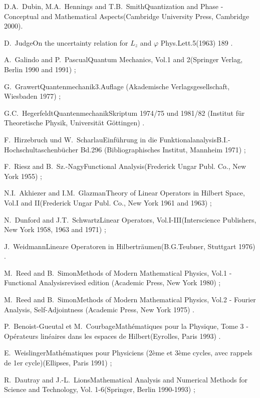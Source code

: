 \documentclass[a4wide,12pt]{report}
\begin{document}
\begin{thebibliography}{22}
\bookref
{D.A.~Dubin, M.A.~Hennings and T.B.~Smith}{Quantization and Phase -
Conceptual and Mathematical Aspects}{(Cambridge University Press,
Cambridge 2000).}

\artref
{D.~Judge}{On the uncertainty relation for $L_z$ and $\varphi$}{
Phys.Lett.}{5}{(1963) 189 .}

 
\bookref
{A.~Galindo and P.~Pascual}{Quantum Mechanics, Vol.1 and 2}{(Springer
Verlag, Berlin 1990 and 1991) ;}
 
\bookref
{G.~Grawert}{Quantenmechanik}{3.Auflage
(Akademische Verlagsgesellschaft,
Wiesbaden 1977) ;}
 
\bookref
{G.C.~Hegerfeldt}{Quantenmechanik}{Skriptum
1974/75 und 1981/82 (Institut f\"ur Theoretische Physik,
Universit\"at G\"ottingen) .}
 
 
\bookref
{F.~Hirzebruch und W.~Scharlau}{Einf\"uhrung in die
Funktional\-analysis}{B.I.-Hochschultaschenb\"ucher
Bd.296 (Bibliographisches Institut,
Mannheim 1971) ;}
 
\bookref
{F.~Riesz and B.~Sz.-Nagy}{Functional Analysis}{(Frederick Ungar
Publ. Co., New York 1955) ;}
 
\bookref
{N.I.~Akhiezer and I.M.~Glazman}{Theory of Linear Operators in
Hilbert Space, Vol.I and II}{(Frederick Ungar Publ. Co., New York 1961
and 1963) ;}
 
\bookref
{N.~Dunford and J.T.~Schwartz}{Linear Operators,
Vol.I-III}{(Interscience Publishers, New York 1958, 1963 and 1971) ;}
 
\bookref
{J.~Weidmann}{Lineare Operatoren in Hilbertr\"aumen}{(B.G.Teubner,
Stuttgart 1976) .}
 

\bookref
{M.~Reed and B.~Simon}{Methods of Modern Mathematical Physics, Vol.1 -
Functional Analysis}{revised edition
(Academic Press, New York 1980) ;}
 
\bookref
{M.~Reed and B.~Simon}{Methods of Modern Mathematical Physics, Vol.2 -
Fourier Analysis, Self-Adjointness}{
(Academic Press, New York 1975) .}
 

\bookref
{P.~Benoist-Gueutal et M.~Courbage}{Math\'ematiques pour
la Physique, Tome 3 - Op\'erateurs lin\'eaires dans les espaces
de Hilbert}{(Eyrolles, Paris 1993) .}


\bookref
{E.~Weislinger}{Math\'ematiques pour Physiciens
(2\`eme et 3\`eme cycles, avec rappels de 1er
cycle)}{(Ellipses, Paris 1991) ;}
 
\bookref
{R.~Dautray and J.-L.~Lions}{Mathematical Analysis and Numerical 
Methods for Science and Technology, Vol. 1-6}{(Springer, 
Berlin 1990-1993) ;}
 

\end{thebibliography}
\end{document}

